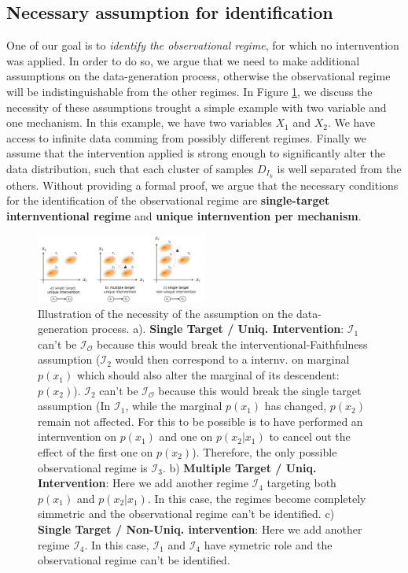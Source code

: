 \documentclass{article}
\begin{document}
\subsection{Necessary assumption for identification}\label{subsec:Relevance}

One of our goal is to \textit{identify the observational regime}, for which no internvention was applied. In order to do so, we argue that we need to make additional assumptions on the data-generation process, otherwise the observational regime will be indistinguishable from the other regimes. In Figure \ref{fig:assumption}, we discuss the necessity of these assumptions trought a simple example with two variable and one mechanism. In this example, we have two variables $X_1$ and $X_2$. We have access to infinite data comming from possibly different regimes. Finally we assume that the intervention applied is strong enough to significantly alter the data distribution, such that each cluster of samples $D_{I_k}$ is well separated from the others. Without providing a formal proof, we argue that the necessary conditions for the identification of the observational regime are  \textbf{single-target internventional regime} and \textbf{unique internvention per mechanism}.

\begin{figure}
    \centering
        \includegraphics[width=0.5\textwidth]{images/assumption.pdf}
        \caption{Illustration of the necessity of the assumption on the data-generation process. a). \textbf{Single Target / Uniq. Intervention}: $\mathcal{I}_1$ can't be $\mathcal{I}_{\mathcal{O}}$ because this would break the interventional-Faithfulness assumption ($\mathcal{I}_2$ would then correspond to a internv. on marginal $p(x_1)$ which should also alter the marginal of its descendent: $p(x_2)$). $\mathcal{I}_2$ can't be $\mathcal{I}_{\mathcal{O}}$ because this would break the single target assumption (In $\mathcal{I}_1$, while the marginal $p(x_1)$ has changed, $p(x_2)$ remain not affected. For this to be possible is to have performed an internvention on $p(x_1)$ and one on $p(x_2|x_1)$ to cancel out the effect of the first one on $p(x_2)$). Therefore, the only possible observational regime is $\mathcal{I}_3$. b) \textbf{Multiple Target / Uniq. Intervention}: Here we add another regime $\mathcal{I}_4$ targeting both $p(x_1)$ and $p(x_2|x_1)$. In this case, the regimes become completely simmetric and the observational regime can't be identified. c) \textbf{Single Target / Non-Uniq. intervention}: Here we add another regime $\mathcal{I}_4$. In this case, $\mathcal I_1$ and $\mathcal{I}_4$ have symetric role and the observational regime can't be identified.}
        \label{fig:assumption}
    \end{figure}
\end{document}
